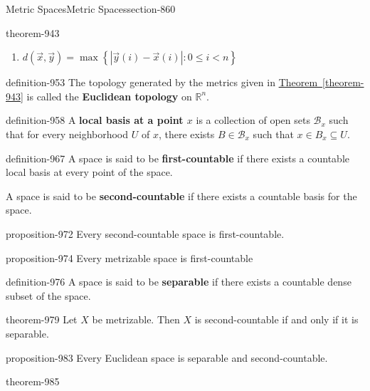 \documentclass[oneside,10pt,]{article}
\newcommand{\terminology}[1]{\textbf{#1}}
\newcommand{\mb}{\mathbb}
\newcommand{\mc}{\mathcal}
\newcommand{\setBuilder}[2]{\left\{#1:#2\right\}}
\newcommand{\lt}{<}
\begin{document}
\begin{sectionptx}{Metric Spaces}{}{Metric Spaces}{}{}{section-860}
\begin{theorem}{}{}{theorem-943}
\begin{enumerate}
\item\hypertarget{li-951}{}\(d(\vec x,\vec y)=\max\setBuilder{|\vec y(i)-\vec x(i)|}{0\leq i\lt n}\)%
\end{enumerate}
\end{theorem}
\begin{definition}{}{definition-953}%
\hypertarget{p-954}{}%
The topology generated by the metrics given in \hyperref[theorem-943]{Theorem~\ref{theorem-943}} is called the \terminology{Euclidean topology} on \(\mb R^n\).%
\end{definition}
\begin{definition}{}{definition-958}%
\hypertarget{p-959}{}%
A \terminology{local basis at a point \(x\)} is a collection of open sets \(\mc B_x\) such that for every neighborhood \(U\) of \(x\), there exists \(B\in\mc B_x\) such that \(x\in B_x\subseteq U\).%
\end{definition}
\begin{definition}{}{definition-967}%
\hypertarget{p-968}{}%
A space is said to be \terminology{first-countable} if there exists a countable local basis at every point of the space.%
\par
\hypertarget{p-970}{}%
A space is said to be \terminology{second-countable} if there exists  a countable basis for the space.%
\end{definition}
\begin{proposition}{}{}{proposition-972}%
\hypertarget{p-973}{}%
Every second-countable space is first-countable.%
\end{proposition}
\begin{proposition}{}{}{proposition-974}%
\hypertarget{p-975}{}%
Every metrizable space is first-countable%
\end{proposition}
\begin{definition}{}{definition-976}%
\hypertarget{p-977}{}%
A space is said to be \terminology{separable} if there exists a countable dense subset of the space.%
\end{definition}
\begin{theorem}{}{}{theorem-979}%
\hypertarget{p-980}{}%
Let \(X\) be metrizable. Then \(X\) is second-countable if and only if it is separable.%
\end{theorem}
\begin{proposition}{}{}{proposition-983}%
\hypertarget{p-984}{}%
Every Euclidean space is separable and second-countable.%
\end{proposition}
\begin{theorem}{}{}{theorem-985}%
\hypertarget{p-986}{}%

\end{theorem}
\end{sectionptx}
\end{document}
